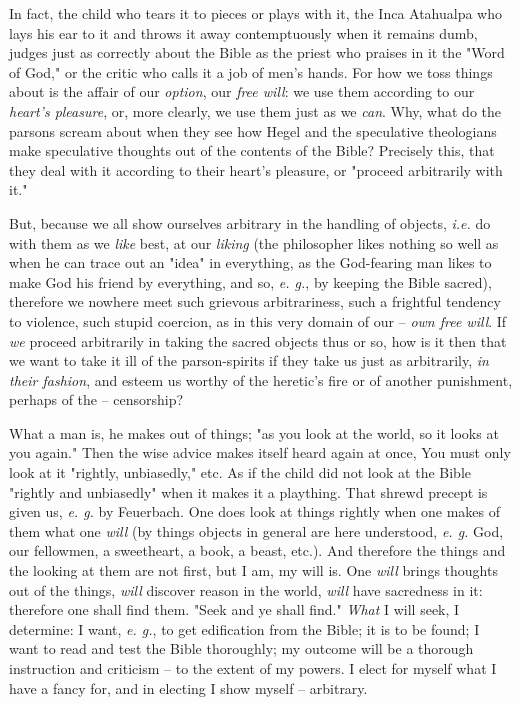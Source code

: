 In fact, the child who tears it to pieces or plays with it, the Inca Atahualpa 
who lays his ear to it and throws it away contemptuously when it remains dumb, 
judges just as correctly about the Bible as the priest who praises in it the 
"{}Word of God,"{} or the critic who calls it a job of men's hands. For how we 
toss things about is the affair of our \textit{option}, our \textit{free 
will}: we use them according to our \textit{heart's pleasure}, or, more 
clearly, we use them just as we \textit{can}. Why, what do the parsons scream 
about when they see how Hegel and the speculative theologians make speculative 
thoughts out of the contents of the Bible? Precisely this, that they deal with 
it according to their heart's pleasure, or "{}proceed arbitrarily with it."{}

But, because we all show ourselves arbitrary in the handling of objects, 
\textit{i.e.} do with them as we \textit{like} best, at our \textit{liking} 
(the philosopher likes nothing so well as when he can trace out an "{}idea"{} 
in everything, as the God-fearing man likes to make God his friend by 
everything, and so, \textit{e. g.}, by keeping the Bible sacred), therefore we 
nowhere meet such grievous arbitrariness, such a frightful tendency to 
violence, such stupid coercion, as in this very domain of our -- \textit{own 
free will}. If \textit{we} proceed arbitrarily in taking the sacred objects 
thus or so, how is it then that we want to take it ill of the parson-spirits 
if they take us just as arbitrarily, \textit{in their fashion}, and esteem us 
worthy of the heretic's fire or of another punishment, perhaps of the -- 
censorship?

What a man is, he makes out of things; "{}as you look at the world, so it 
looks at you again."{} Then the wise advice makes itself heard again at once, 
You must only look at it "{}rightly, unbiasedly,"{} etc. As if the child did 
not look at the Bible "{}rightly and unbiasedly"{} when it makes it a 
plaything. That shrewd precept is given us, \textit{e. g.} by Feuerbach. One 
does look at things rightly when one makes of them what one \textit{will} (by 
things objects in general are here understood, \textit{e. g.} God, our 
fellowmen, a sweetheart, a book, a beast, etc.). And therefore the things and 
the looking at them are not first, but I am, my will is. One \textit{will} 
brings thoughts out of the things, \textit{will} discover reason in the world, 
\textit{will} have sacredness in it: therefore one shall find them. "{}Seek 
and ye shall find."{} \textit{What} I will seek, I determine: I want, 
\textit{e. g.}, to get edification from the Bible; it is to be found; I want 
to read and test the Bible thoroughly; my outcome will be a thorough 
instruction and criticism -- to the extent of my powers. I elect for myself 
what I have a fancy for, and in electing I show myself -- arbitrary.

